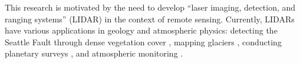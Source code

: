 This research is motivated by the need to develop ``laser imaging, detection, and ranging systems'' (LIDAR) in the context of remote sensing. Currently, LIDARs have various applications in geology and atmospheric physics: detecting the Seattle Fault through dense vegetation cover \cite{Harding:2000a}, mapping glaciers \cite{Hopkinson:2001a}, conducting planetary surveys \cite{Neumann:2001a}, and atmospheric monitoring \cite{Fernald:1984a,Goldsmith:1998a}.

